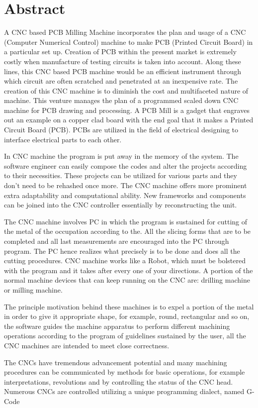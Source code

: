 \chapter*{Abstract}

A CNC based PCB Milling Machine incorporates the plan and usage of a CNC (Computer Numerical Control) machine to make PCB (Printed Circuit Board) in a particular set up. Creation of PCB within the present market is extremely costly when manufacture of testing circuits is taken into account. Along these lines, this CNC based PCB machine would be an efficient instrument through which circuit are often scratched and penetrated at an inexpensive rate. The creation of this CNC machine is to diminish the cost and multifaceted nature of machine. This venture manages the plan of a programmed scaled down CNC machine for PCB drawing and processing.  
A PCB Mill is a gadget that engraves out an example on a copper clad board with the end goal that it makes a Printed Circuit Board (PCB). PCBs are utilized in the field of electrical designing to interface electrical parts to each other.

 In CNC machine the program is put away in the memory of the system. The software engineer can easily compose the codes and alter the projects according to their necessities. These projects can be utilized for various parts and they don’t need to be rehashed once more. The CNC machine offers more prominent extra adaptability and computational ability. New frameworks and components can be joined into the CNC controller essentially by reconstructing the unit.
 
The CNC machine involves PC in which the program is sustained for cutting of the metal of the occupation according to the. All the slicing forms that are to be completed and all last measurements are encouraged into the PC through program. The PC hence realizes what precisely is to be done and does all the cutting procedures. CNC machine works like a Robot, which must be bolstered with the program and it takes after every one of your directions. A portion of the normal machine devices that can keep running on the CNC are: drilling machine or milling machine.

The principle motivation behind these machines is to expel a portion of the metal in order to give it appropriate shape, for example, round, rectangular and so on, the software guides the machine apparatus to perform different machining operations according to the program of guidelines sustained by the user, all the CNC machines are intended to meet close correctness.

The CNCs have tremendous advancement potential and many machining procedures can be communicated by methods for basic operations, for example interpretations, revolutions and by controlling the status of the CNC head. Numerous CNCs are controlled utilizing a unique programming dialect, named G-Code





